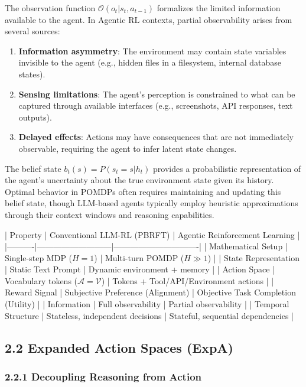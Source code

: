 The observation function $\mathcal{O}(o_t | s_t, a_{t-1})$ formalizes the limited information available to the agent. In Agentic RL contexts, partial observability arises from several sources:

\begin{enumerate}
    \item \textbf{Information asymmetry}: The environment may contain state variables invisible to the agent (e.g., hidden files in a filesystem, internal database states).

    \item \textbf{Sensing limitations}: The agent's perception is constrained to what can be captured through available interfaces (e.g., screenshots, API responses, text outputs).

    \item \textbf{Delayed effects}: Actions may have consequences that are not immediately observable, requiring the agent to infer latent state changes.

\end{enumerate}
The belief state $b_t(s) = P(s_t = s | h_t)$ provides a probabilistic representation of the agent's uncertainty about the true environment state given its history. Optimal behavior in POMDPs often requires maintaining and updating this belief state, though LLM-based agents typically employ heuristic approximations through their context windows and reasoning capabilities.

| Property | Conventional LLM-RL (PBRFT) | Agentic Reinforcement Learning |
|----------|---------------------------|-------------------------------|
| Mathematical Setup | Single-step MDP ($H = 1$) | Multi-turn POMDP ($H \gg 1$) |
| State Representation | Static Text Prompt | Dynamic environment + memory |
| Action Space | Vocabulary tokens ($\mathcal{A} = \mathcal{V}$) | Tokens + Tool/API/Environment actions |
| Reward Signal | Subjective Preference (Alignment) | Objective Task Completion (Utility) |
| Information | Full observability | Partial observability |
| Temporal Structure | Stateless, independent decisions | Stateful, sequential dependencies |

\subsection{2.2 Expanded Action Spaces (ExpA)}

\subsubsection{2.2.1 Decoupling Reasoning from Action}

